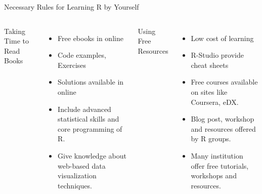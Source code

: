 \documentclass[aspectratio=169]{beamer}
\begin{document}
\begin{frame}{Necessary Rules for Learning R by Yourself}
	
	\begin{columns} 
		 {\color{red!200}Taking Time to Read Books}
		\begin{itemize}
			\item Free ebooks in online
			\item  Code examples, Exercises
			\item Solutions available in online
			\item Include advanced statistical skills and core programming of R.
			\item Give knowledge about web-based data visualization techniques.
		\end{itemize}
		
		 {\color{red!200}Using Free Resources}
		\begin{itemize}
			\item Low cost of learning
			\item  R-Studio provide cheat sheets
			\item Free courses available on sites like Coursera, eDX.
			\item Blog post, workshop and resources offered by R groups.
			\item Many institution offer free tutorials, workshops and resources.
		\end{itemize}	
		
	\end{columns}	
\end{frame}
\end{document}
